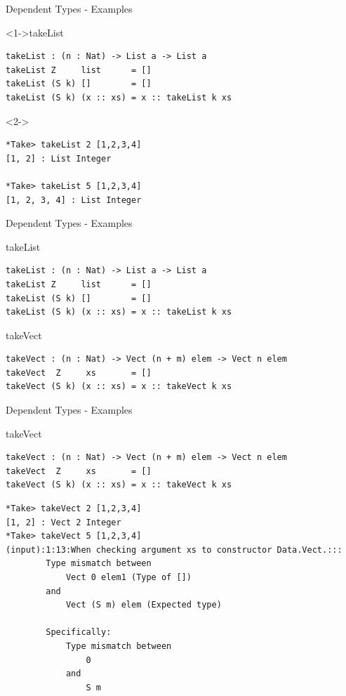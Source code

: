 \documentclass{beamer}
\begin{document}
\begin{frame}[fragile]{Dependent Types - Examples}
	\begin{block}<1->{takeList}
		 \begin{lstlisting}[basicstyle=\ttfamily\scriptsize]
takeList : (n : Nat) -> List a -> List a
takeList Z     list      = []
takeList (S k) []        = []
takeList (S k) (x :: xs) = x :: takeList k xs
		\end{lstlisting}
	\end{block}
\begin{block}<2->{}
	\begin{lstlisting}[basicstyle=\ttfamily\scriptsize]
*Take> takeList 2 [1,2,3,4]
[1, 2] : List Integer
		
*Take> takeList 5 [1,2,3,4]
[1, 2, 3, 4] : List Integer
	\end{lstlisting}
\end{block}
\end{frame}
\begin{frame}[fragile]{Dependent Types - Examples}
	\begin{block}{takeList}
		\begin{lstlisting}[basicstyle=\ttfamily\scriptsize]
takeList : (n : Nat) -> List a -> List a
takeList Z     list      = []
takeList (S k) []        = []
takeList (S k) (x :: xs) = x :: takeList k xs
		\end{lstlisting}
	\end{block}
\begin{block}{takeVect}
	\begin{lstlisting}[basicstyle=\ttfamily\scriptsize]
takeVect : (n : Nat) -> Vect (n + m) elem -> Vect n elem
takeVect  Z     xs       = []
takeVect (S k) (x :: xs) = x :: takeVect k xs
	\end{lstlisting}
\end{block}
\end{frame}

\begin{frame}[fragile]{Dependent Types - Examples}
	\begin{block}{takeVect}
		\begin{lstlisting}[basicstyle=\ttfamily\scriptsize]
takeVect : (n : Nat) -> Vect (n + m) elem -> Vect n elem
takeVect  Z     xs       = []
takeVect (S k) (x :: xs) = x :: takeVect k xs
		\end{lstlisting}
	\end{block}
	\begin{block}{}
		\begin{lstlisting}[basicstyle=\ttfamily\scriptsize]
*Take> takeVect 2 [1,2,3,4]
[1, 2] : Vect 2 Integer
*Take> takeVect 5 [1,2,3,4]
(input):1:13:When checking argument xs to constructor Data.Vect.:::
		Type mismatch between
			Vect 0 elem1 (Type of [])
		and
			Vect (S m) elem (Expected type)
			
		Specifically:
			Type mismatch between
				0
			and
				S m
		\end{lstlisting}
	\end{block}
\end{frame}
\end{document}
